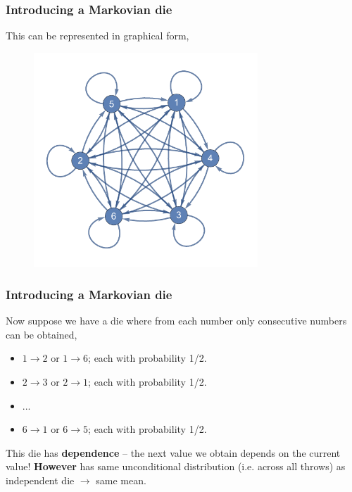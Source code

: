 \documentclass[handout]{beamer}
\begin{document}
\begin{frame}
	\frametitle{Introducing a Markovian die}
	 This can be represented in graphical form,
	
	\begin{figure}[ht]
		\centerline{\includegraphics[width=0.75\textwidth]{./Figures/lec6_independentDie.pdf}}
	\end{figure}
	
\end{frame}

\begin{frame}
	\frametitle{Introducing a Markovian die}
	 Now suppose we have a die where from each number only consecutive numbers can be obtained,
	
	\begin{itemize}
		\item<3-> $1\rightarrow 2$ or $1\rightarrow 6$; each with probability 1/2.
		\item<4-> $2\rightarrow 3$ or $2\rightarrow 1$; each with probability 1/2.
		\item<5-> ...
		\item<6-> $6\rightarrow 1$ or $6\rightarrow 5$; each with probability 1/2.
	\end{itemize}
	
	 This die has \textbf{dependence} -- the next value we obtain depends on the current value!
	\onslide<8-> \textbf{However} has same unconditional distribution (i.e. across all throws) as independent die \onslide<9-> $\rightarrow$ same mean.
	
\end{frame}
\end{document}
